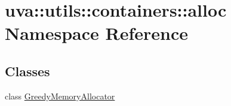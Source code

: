 \hypertarget{namespaceuva_1_1utils_1_1containers_1_1alloc}{}\section{uva\+:\+:utils\+:\+:containers\+:\+:alloc Namespace Reference}
\label{namespaceuva_1_1utils_1_1containers_1_1alloc}
\subsection*{Classes}
\begin{DoxyCompactItemize}
\item 
class \hyperlink{classuva_1_1utils_1_1containers_1_1alloc_1_1_greedy_memory_allocator}{Greedy\+Memory\+Allocator}
\end{DoxyCompactItemize}
